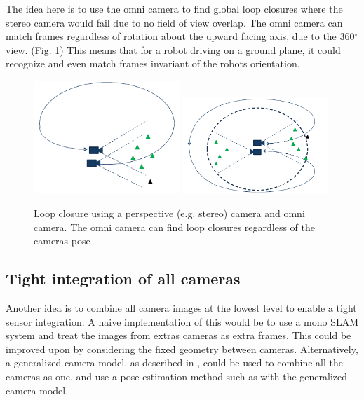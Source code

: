 The idea here is to use the omni camera to find global loop closures where the stereo camera would fail due to no field of view overlap.  The omni camera can match frames regardless of rotation about the upward facing axis, due to the 360$^{\circ}$ view.  (Fig. \ref{fig:omni_loop_close}) This means that for a robot driving on a ground plane, it could recognize and even match frames invariant of the robots orientation.

\begin{figure}[h!]
  \centering
    \includegraphics[width=0.49\textwidth]{chapters/images/stereo_loop}
    \includegraphics[width=0.49\textwidth]{chapters/images/omni_loop} 
    \caption{Loop closure using a perspective (e.g. stereo) camera and omni camera.  The omni camera can find loop closures regardless of the cameras pose}
  \label{fig:omni_loop_close}
\end{figure}

\subsection{Tight integration of all cameras}

Another idea is to combine all camera images at the lowest level to enable a tight sensor integration.  A naive implementation of this would be to use a mono SLAM system and treat the images from extras cameras as extra frames.  This could be improved upon by considering the fixed geometry between cameras.  Alternatively, a generalized camera model, as described in \cite{pless_03}, could be used to combine all the cameras as one, and use a pose estimation method such as \cite{stewenius_05} with the generalized camera model.

